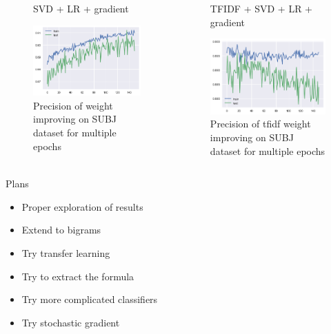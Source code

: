 \documentclass[xcolor={table}]{beamer}
\begin{document}
\begin{frame}{}
	\begin{columns}
   				\begin{figure}[H]
        			\centering
        			\caption*{SVD + LR + gradient}
        			\includegraphics[height=0.4\textheight]{images/SUBJDataset_grad.png}
        			\caption{Precision of weight improving on SUBJ dataset for multiple epochs}
        		\end{figure}

        		\begin{figure}[H]
        			\centering
        			\caption*{TFIDF + SVD + LR + gradient}
        			\includegraphics[height=0.4\textheight]{images/SUBJDataset_tfidf_grad.png}
        			\caption{Precision of tfidf weight improving on SUBJ dataset for multiple epochs}
        		\end{figure}
	\end{columns}        		
\end{frame} 



\begin{frame}{Plans}
    \begin{block}{}
        \begin{itemize}   
            \item Proper exploration of results
            \item Extend to bigrams
            \item Try transfer learning
            \item Try to extract the formula
            \item Try more complicated classifiers
            \item Try stochastic gradient \cite{brand2006fast}
        \end{itemize}
    \end{block}
\end{frame} 
\end{document}
